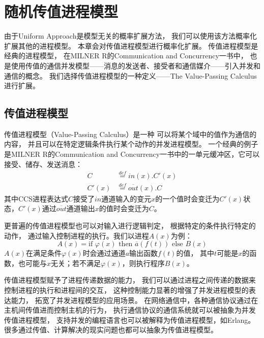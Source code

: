 
\chapter{随机传值进程模型}\label{ch:rvpc}

由于Uniform Approach是模型无关的概率扩展方法，
我们可以使用该方法概率化扩展其他的进程模型。
本章会对传值进程模型进行概率化扩展。
传值进程模型是经典的进程模型，
在MILNER R的Communication and Concurrency一书\cite{Milner_CCS}中，
也是使用传值的通信并发模型——消息的发送者、接受者和通信媒介——引入并发和通信的概念。
我们选择传值进程模型的一种定义——The Value-Passing Calculus\cite{Fu_VPC}进行扩展。

\section{传值进程模型}
传值进程模型（Value-Passing Calculus）是一种
可以将某个域中的值作为通信的内容，
并且可以在特定逻辑条件执行某个动作的并发进程模型。
一个经典的例子是MILNER R的Communication and Concurrency一书\cite{Milner_CCS}中的一单元缓冲区，它可以接受、储存、发送消息：
\begin{align*}
   C&\stackrel{def}{=}in(x).C'(x)\\
   C'(x)&\stackrel{def}{=}\overline{out}(x).C
\end{align*}
其中CCS进程表达式$C$接受了$in$通道输入的变元$x$的一个值时会变迁为$C'(x)$状态，$C'(x)$通过$\overline{out}$通道输出$x$的值时会变迁为$C$。

更普遍的传值进程模型也可以对输入进行逻辑判定，
根据特定的条件执行特定的动作，
通过输入控制进程的执行。我们以进程$A(x)$为例：
$$A(x)=\textrm{if }\varphi(x)\textrm{ then }\overline{a}(f(t))\textrm{ else }B(x)$$
$A(x)$在满足条件$\varphi(x)$时会通过通道$a$输出函数$f(t)$的值，
其中$t$可能是$x$的函数，也可能与$x$无关；若不满足$\varphi(x)$，则执行程序$B(x)$。

传值进程模型赋予了进程传递数据的能力，
我们可以通过进程之间传递的数据来控制进程的执行和进程间的交互，
这种控制能力显著的增强了并发进程模型的表达能力，
拓宽了并发进程模型的应用场景。
在网络通信中，各种通信协议通过在主机间传值进而控制主机的行为，
执行通信协议的通信系统就可以被抽象为并发传值进程模型，
支持并发的编程语言也可以被解释为传值进程模型，如Erlang\cite{Erlang}。
很多通过传值、计算解决的现实问题也都可以抽象为传值进程模型。


